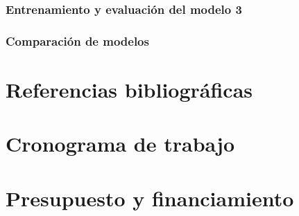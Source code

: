 \documentclass{article}
\theoremstyle{mytheoremstyle}
\theoremstyle{mytheoremstyle}
\theoremstyle{myproblemstyle}
\begin{document}
    \subsubsection{Entrenamiento y evaluación del modelo 3}
    \subsubsection{Comparación de modelos}

    

    \section{Referencias bibliográficas}
    \printbibliography

    \section{Cronograma de trabajo}


    \begin{figure}
        
        
    \end{figure}
    \section{Presupuesto y financiamiento}
\end{document}
